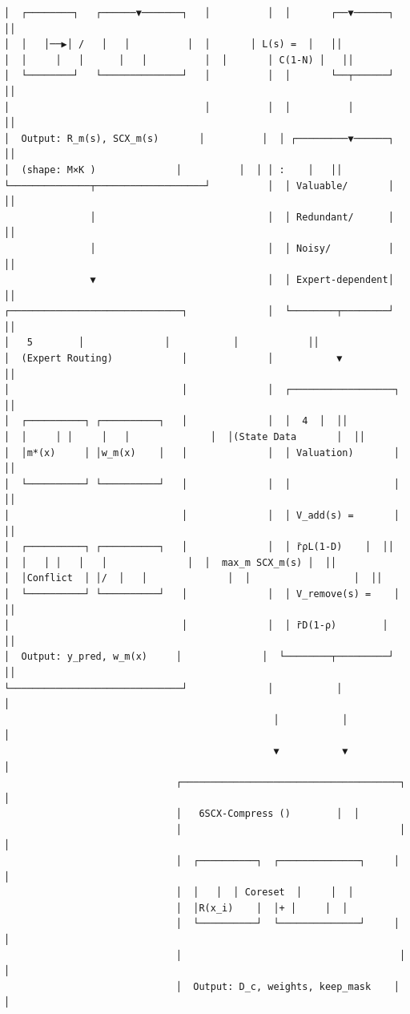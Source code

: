 \documentclass[
  12pt,
]{article}
\begin{document}
\begin{verbatim}
│  ┌────────┐   ┌──────▼───────┐   │          │  │       ┌──▼──────┐   ││
│  │   │──▶│ /   │   │          │  │       │ L(s) =  │   ││
│  │     │   │      │   │          │  │       │ C(1-N) │   ││
│  └────────┘   └──────────────┘   │          │  │       └──┬──────┘   ││
│                                  │          │  │          │          ││
│  Output: R_m(s), SCX_m(s)       │          │  │ ┌─────────▼──────┐   ││
│  (shape: M×K )              │          │  │ │ :    │   ││
└──────────────┬───────────────────┘          │  │ Valuable/       │   ││
               │                              │  │ Redundant/      │   ││
               │                              │  │ Noisy/          │   ││
               ▼                              │  │ Expert-dependent│   ││
┌──────────────────────────────┐              │  └────────┬────────┘   ││
│   5        │              │           │            ││
│  (Expert Routing)            │              │           ▼            ││
│                              │              │  ┌──────────────────┐  ││
│  ┌──────────┐ ┌──────────┐   │              │  │  4  │  ││
│  │     │ │     │   │              │  │(State Data       │  ││
│  │m*(x)     │ │w_m(x)    │   │              │  │ Valuation)       │  ││
│  └──────────┘ └──────────┘   │              │  │                  │  ││
│                              │              │  │ V_add(s) =       │  ││
│  ┌──────────┐ ┌──────────┐   │              │  │ r̄ρL(1-D)    │  ││
│  │   │ │   │   │              │  │  max_m SCX_m(s) │  ││
│  │Conflict  │ │/  │   │              │  │                  │  ││
│  └──────────┘ └──────────┘   │              │  │ V_remove(s) =    │  ││
│                              │              │  │ r̄D(1-ρ)        │  ││
│  Output: y_pred, w_m(x)     │              │  └────────┬─────────┘  ││
└──────────────────────────────┘              │           │            │
                                               │           │            │
                                               ▼           ▼            │
                              ┌──────────────────────────────────────┐  │
                              │   6SCX-Compress ()        │  │
                              │                                      │  │
                              │  ┌──────────┐  ┌──────────────┐     │  │
                              │  │   │  │ Coreset  │     │  │
                              │  │R(x_i)    │  │+ │     │  │
                              │  └──────────┘  └──────────────┘     │  │
                              │                                      │  │
                              │  Output: D_c, weights, keep_mask    │  │

\end{verbatim}
\end{document}
